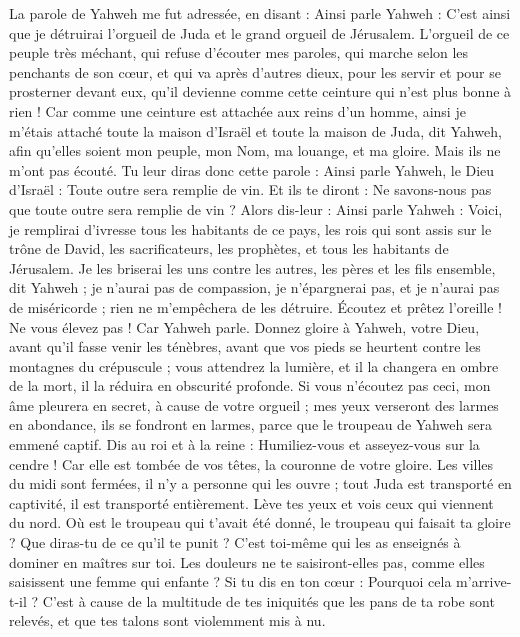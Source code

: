 \begin{multicols}{2}
La parole de Yahweh me fut adressée, en disant :
Ainsi parle Yahweh : C'est ainsi que je détruirai l'orgueil de Juda et le grand orgueil de Jérusalem.
L'orgueil de ce peuple très méchant, qui refuse d'écouter mes paroles, qui marche selon les penchants de son cœur, et qui va après d'autres dieux, pour les servir et pour se prosterner devant eux, qu'il devienne comme cette ceinture qui n'est plus bonne à rien !
Car comme une ceinture est attachée aux reins d'un homme, ainsi je m'étais attaché toute la maison d'Israël et toute la maison de Juda, dit Yahweh, afin qu'elles soient mon peuple, mon Nom, ma louange, et ma gloire. Mais ils ne m'ont pas écouté.
Tu leur diras donc cette parole : Ainsi parle Yahweh, le Dieu d'Israël : Toute outre sera remplie de vin. Et ils te diront : Ne savons-nous pas que toute outre sera remplie de vin ?
Alors dis-leur : Ainsi parle Yahweh : Voici, je remplirai d'ivresse tous les habitants de ce pays, les rois qui sont assis sur le trône de David, les sacrificateurs, les prophètes, et tous les habitants de Jérusalem.
Je les briserai les uns contre les autres, les pères et les fils ensemble, dit Yahweh ; je n'aurai pas de compassion, je n'épargnerai pas, et je n'aurai pas de miséricorde ; rien ne m'empêchera de les détruire.
Écoutez et prêtez l'oreille ! Ne vous élevez pas ! Car Yahweh parle.
Donnez gloire à Yahweh, votre Dieu, avant qu'il fasse venir les ténèbres, avant que vos pieds se heurtent contre les montagnes du crépuscule ; vous attendrez la lumière, et il la changera en ombre de la mort, il la réduira en obscurité profonde.
Si vous n'écoutez pas ceci, mon âme pleurera en secret, à cause de votre orgueil ; mes yeux verseront des larmes en abondance, ils se fondront en larmes, parce que le troupeau de Yahweh sera emmené captif.
Dis au roi et à la reine : Humiliez-vous et asseyez-vous sur la cendre ! Car elle est tombée de vos têtes, la couronne de votre gloire.
Les villes du midi sont fermées, il n'y a personne qui les ouvre ; tout Juda est transporté en captivité, il est transporté entièrement.
Lève tes yeux et vois ceux qui viennent du nord. Où est le troupeau qui t'avait été donné, le troupeau qui faisait ta gloire ?
Que diras-tu de ce qu'il te punit ? C'est toi-même qui les as enseignés à dominer en maîtres sur toi. Les douleurs ne te saisiront-elles pas, comme elles saisissent une femme qui enfante ?
Si tu dis en ton cœur : Pourquoi cela m'arrive-t-il ? C'est à cause de la multitude de tes iniquités que les pans de ta robe sont relevés, et que tes talons sont violemment mis à nu.

\end{multicols}
